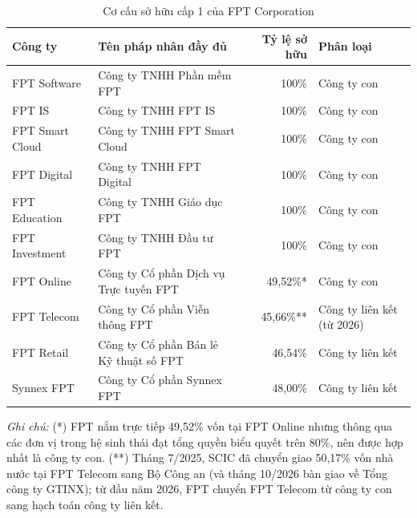 \begin{table}[htbp]
\centering
\caption{Cơ cấu sở hữu cấp 1 của FPT Corporation}
\label{tab:so_huu_cap_1}
\begin{tabularx}{\textwidth}{p{3.2cm} X r p{3.6cm}}
\toprule
\textbf{Công ty} & \textbf{Tên pháp nhân đầy đủ} & \textbf{Tỷ lệ sở hữu} & \textbf{Phân loại} \\
\midrule
FPT Software & Công ty TNHH Phần mềm FPT & 100\% & Công ty con \\
FPT IS & Công ty TNHH FPT IS & 100\% & Công ty con \\
FPT Smart Cloud & Công ty TNHH FPT Smart Cloud & 100\% & Công ty con \\
FPT Digital & Công ty TNHH FPT Digital & 100\% & Công ty con \\
FPT Education & Công ty TNHH Giáo dục FPT & 100\% & Công ty con \\
FPT Investment & Công ty TNHH Đầu tư FPT & 100\% & Công ty con \\
FPT Online & Công ty Cổ phần Dịch vụ Trực tuyến FPT & 49,52\%* & Công ty con \\
FPT Telecom & Công ty Cổ phần Viễn thông FPT & 45,66\%** & Công ty liên kết (từ 2026) \\
FPT Retail & Công ty Cổ phần Bán lẻ Kỹ thuật số FPT & 46,54\% & Công ty liên kết \\
Synnex FPT & Công ty Cổ phần Synnex FPT & 48,00\% & Công ty liên kết \\
\bottomrule
\end{tabularx}
\end{table}

\noindent\footnotesize{\textit{Ghi chú:} (*) FPT nắm trực tiếp 49,52\% vốn tại FPT Online nhưng thông qua các đơn vị trong hệ sinh thái đạt tổng quyền biểu quyết trên 80\%, nên được hợp nhất là công ty con. (**) Tháng 7/2025, SCIC đã chuyển giao 50,17\% vốn nhà nước tại FPT Telecom sang Bộ Công an (và tháng 10/2026 bàn giao về Tổng công ty GTINX); từ đầu năm 2026, FPT chuyển FPT Telecom từ công ty con sang hạch toán công ty liên kết.}\normalsize

